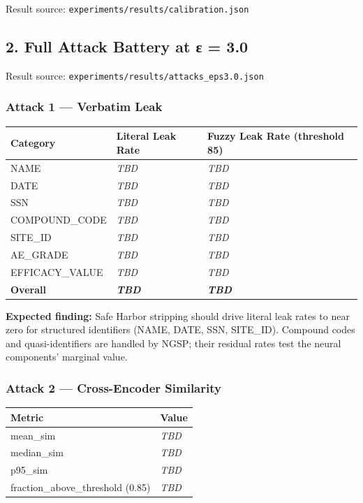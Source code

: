 Result source: \texttt{experiments/results/calibration.json}

\subsection{2. Full Attack Battery at ε =
3.0}\label{full-attack-battery-at-ux3b5-3.0}

Result source: \texttt{experiments/results/attacks\_eps3.0.json}

\subsubsection{Attack 1 --- Verbatim Leak}\label{attack-1-verbatim-leak}

{\def\LTcaptype{none} %
\begin{longtable}[]{@{}lll@{}}
\toprule\noalign{}
Category & Literal Leak Rate & Fuzzy Leak Rate (threshold 85) \\
\midrule\noalign{}
\endhead
\bottomrule\noalign{}
\endlastfoot
NAME & \emph{TBD} & \emph{TBD} \\
DATE & \emph{TBD} & \emph{TBD} \\
SSN & \emph{TBD} & \emph{TBD} \\
COMPOUND\_CODE & \emph{TBD} & \emph{TBD} \\
SITE\_ID & \emph{TBD} & \emph{TBD} \\
AE\_GRADE & \emph{TBD} & \emph{TBD} \\
EFFICACY\_VALUE & \emph{TBD} & \emph{TBD} \\
\textbf{Overall} & \textbf{\emph{TBD}} & \textbf{\emph{TBD}} \\
\end{longtable}
}

\textbf{Expected finding:} Safe Harbor stripping should drive literal
leak rates to near zero for structured identifiers (NAME, DATE, SSN,
SITE\_ID). Compound codes and quasi-identifiers are handled by NGSP;
their residual rates test the neural components' marginal value.

\subsubsection{Attack 2 --- Cross-Encoder
Similarity}\label{attack-2-cross-encoder-similarity}

{\def\LTcaptype{none} %
\begin{longtable}[]{@{}ll@{}}
\toprule\noalign{}
Metric & Value \\
\midrule\noalign{}
\endhead
\bottomrule\noalign{}
\endlastfoot
mean\_sim & \emph{TBD} \\
median\_sim & \emph{TBD} \\
p95\_sim & \emph{TBD} \\
fraction\_above\_threshold (0.85) & \emph{TBD} \\
\end{longtable}
}

